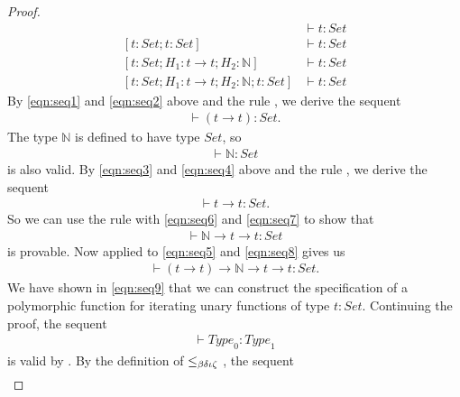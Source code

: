 \begin{proof}
\begin{align}
[t : \mathit{Set}] &\vdash t : \mathit{Set} \label{eqn:seq1} \\
[t : \mathit{Set} ; t : \mathit{Set}] &\vdash t : \mathit{Set} \label{eqn:seq2} \\
[t : \mathit{Set} ; H_1 : t \rightarrow t ; H_2 : \mathbb{N}] &\vdash t : \mathit{Set} \label{eqn:seq3} \\
[t : \mathit{Set} ; H_1 : t \rightarrow t ; H_2 : \mathbb{N} ; t : \mathit{Set}] &\vdash t : \mathit{Set} \label{eqn:seq4}
\end{align}
By \eqref{eqn:seq1} and \eqref{eqn:seq2} above and the rule , we derive the sequent
\begin{align}
[t: \mathit{Set}] \vdash (t \rightarrow t) : \mathit{Set}. \label{eqn:seq5}
\end{align}
The type $\mathbb{N}$ is defined to have type $\mathit{Set}$, so
\begin{align}
[t : \mathit{Set} ; H_1 : t \rightarrow t] \vdash \mathbb{N} : \mathit{Set} \label{eqn:seq6}
\end{align}
is also valid.
By \eqref{eqn:seq3} and \eqref{eqn:seq4} above and the rule , we derive the sequent
\begin{align}
[t : \mathit{Set} ; H_1 : t \rightarrow t ; H_2 : \mathbb{N}] \vdash t \rightarrow t : \mathit{Set} \label{eqn:seq7}.
\end{align}
So we can use the  rule with \eqref{eqn:seq6} and \eqref{eqn:seq7} to show that
\begin{align}
[t : \mathit{Set} ; H_1 : t \rightarrow t] \vdash \mathbb{N} \rightarrow t \rightarrow t : \mathit{Set} \label{eqn:seq8}
\end{align}
is provable.
Now  applied to \eqref{eqn:seq5} and \eqref{eqn:seq8} gives us
\begin{align}
[t : \mathit{Set}] \vdash (t \rightarrow t) \rightarrow \mathbb{N} \rightarrow t \rightarrow t : \mathit{Set}. \label{eqn:seq9}
\end{align}
We have shown in \eqref{eqn:seq9} that we can construct the specification of a polymorphic function for iterating unary functions of type $t : \mathit{Set}$.
Continuing the proof, the sequent
\begin{align}
[t : \mathit{Set}] \vdash \mathit{Type}_0 : \mathit{Type}_1 \label{eqn:seq10}
\end{align}
is valid by . By the definition of $\leq_{\beta\delta\iota\zeta}{}$, the sequent
\begin{align}

\end{align}
\end{proof}

